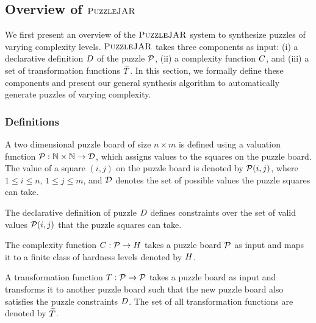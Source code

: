 \subsection{Overview of $\textsc{PuzzleJAR}$}

We first present an overview of the $\textsc{PuzzleJAR}$ system to synthesize
puzzles of varying complexity levels. $\textsc{PuzzleJAR}$ takes three
components as input: (i) a declarative definition $D$ of the
puzzle $\mathcal{P}$, (ii) a complexity function $C$,
and (iii) a set of transformation functions $\widetilde{T}$. In
this section, we formally define these components and present our
general synthesis algorithm to automatically generate puzzles of
varying complexity.

\subsubsection{Definitions}

\begin{definition}
A two dimensional puzzle board of size $n \times m$ is defined using a
valuation function $\mathcal{P}: \mathbb{N} \times \mathbb{N}
\rightarrow \mathcal{D}$, which assigns values to the squares on the
puzzle board. The value of a square $(i,j)$ on the puzzle board is denoted by
$\mathcal{P}(i,j)$, where $1 \leq i \leq n$, $1 \leq j \leq m$, and
$\mathcal{D}$ denotes the set of possible values the puzzle
squares can take.
\end{definition}

\begin{definition}
The declarative definition of puzzle $D$ defines constraints over the set of valid values $\mathcal{P}(i,j)$ that the puzzle squares can take.
\end{definition}

\begin{definition}
The complexity function $C : \mathcal{P} \rightarrow
H$ takes a puzzle board $\mathcal{P}$ as input and maps
it to a finite class of hardness levels denoted by $H$.
\end{definition}

\begin{definition}
A transformation function $T : \mathcal{P} \rightarrow
\mathcal{P}$ takes a puzzle board as input and transforms it to
another puzzle board such that the new puzzle board also satisfies the
puzzle constraints $D$. The set of all transformation
functions are denoted by $\widetilde{T}$.
\end{definition}

